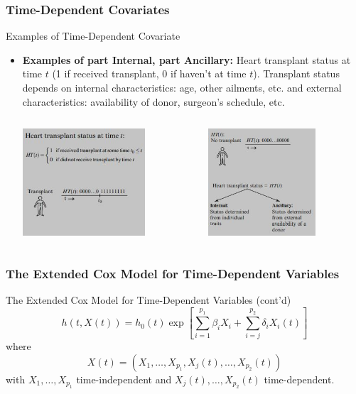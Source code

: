 \documentclass{beamer}
\theoremstyle{definition}
\begin{document}
\begin{frame}
\frametitle{Time-Dependent Covariates}
\begin{block}{Examples of Time-Dependent Covariate}
\begin{itemize}
\item \textbf{Examples of part Internal, part Ancillary:} Heart transplant status at time $t$ (1 if received transplant, 0 if haven't at time $t$). Transplant status depends on internal characteristics:  age, other ailments, etc. and external characteristics: availability of donor, surgeon's schedule, etc.
\begin{columns}
    \begin{column}{0.48\textwidth}
        \includegraphics[width =\textwidth, height=4cm]{CH6_HT.JPG}
    \end{column}
    \hspace{-10pt}
    \begin{column}{0.48\textwidth}
         \includegraphics[width =\textwidth, height=4cm]{CH6_HTS2.JPG}
    \end{column}
\end{columns}
\end{itemize}
\end{block}
\end{frame}

\begin{frame}
\frametitle{The Extended Cox Model for Time-Dependent Variables}
\begin{block}{The Extended Cox Model for Time-Dependent Variables (cont'd)}
\[
h(t,X(t)) = h_0(t) \exp\left[\sum_{i=1}^{p_1} \beta_i X_i + \sum_{i=j}^{p_2} \delta_i X_i(t)\right]
\]
where
\[
X(t)=(X_1,\ldots,X_{p_1},X_j(t),\ldots,X_{p_2}(t))
\]
with $X_1,\ldots,X_{p_1}$ time-independent and $X_j(t),\ldots,X_{p_2}(t)$ time-dependent.
\end{block}
\end{frame}
\end{document}

